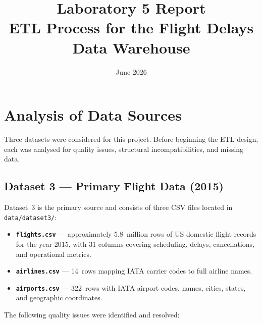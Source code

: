 \documentclass[12pt,a4paper]{article}
\title{\textbf{Laboratory 5 Report}\\[0.5em]
\large ETL Process for the Flight Delays Data Warehouse}
\date{June 2026}
\begin{document}
\maketitle
\tableofcontents
\newpage

\section{Analysis of Data Sources}

Three datasets were considered for this project. Before beginning the ETL
design, each was analysed for quality issues, structural incompatibilities,
and missing data.

\subsection{Dataset 3 — Primary Flight Data (2015)}

Dataset~3 is the primary source and consists of three CSV files located in
\texttt{data/dataset3/}:

\begin{itemize}
    \item \textbf{\texttt{flights.csv}} — approximately 5.8~million rows of US
          domestic flight records for the year 2015, with 31 columns covering
          scheduling, delays, cancellations, and operational metrics.
    \item \textbf{\texttt{airlines.csv}} — 14~rows mapping IATA carrier codes
          to full airline names.
    \item \textbf{\texttt{airports.csv}} — 322~rows with IATA airport codes,
          names, cities, states, and geographic coordinates.
\end{itemize}

The following quality issues were identified and resolved:
\end{document}
